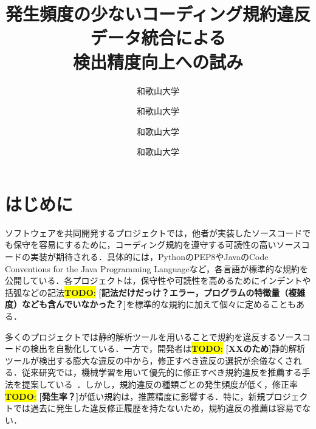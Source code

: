 \documentclass[uplatex,dvipdfmx,a4paper,twocolumn,base=11pt,jbase=11pt,ja=standard]{bxjsarticle}  %
\title{発生頻度の少ないコーディング規約違反データ統合による\\検出精度向上への試み}{Toward improving detection accuracy by integrating occasional coding convention violations datasets}
\author{和歌山大学}{亀岡　令}{Ryo Kameoka, Wakayama University}
\author{和歌山大学}{伊原 彰紀}{Akinori Ihara, Wakayama University}
\author{和歌山大学}{南 雄太}{Yuta Minami, Wakayama University}
\author{和歌山大学}{大森　楓木}{Fuki Omori, Wakayama University}
\newcommand{\todo}[1]{\colorbox{yellow}{{\bf TODO}:}{\color{red} {\textbf{[#1]}}}}
\begin{document}
\maketitle

\section{はじめに}
ソフトウェアを共同開発するプロジェクトでは，他者が実装したソースコードでも保守を容易にするために，コーディング規約を遵守する可読性の高いソースコードの実装が期待される．具体的には，PythonのPEP8やJavaのCode Conventions for the Java Programming Languageなど，各言語が標準的な規約を公開している．各プロジェクトは，保守性や可読性を高めるためにインデントや括弧などの記法\todo{記法だけだっけ？エラー，プログラムの特徴量（複雑度）なども含んでいなかった？}を標準的な規約に加えて個々に定めることもある．


多くのプロジェクトでは静的解析ツールを用いることで規約を違反するソースコードの検出を自動化している．一方で，開発者は\todo{XXのため}静的解析ツールが検出する膨大な違反の中から，修正すべき違反の選択が余儀なくされる．従来研究では，機械学習を用いて優先的に修正すべき規約違反を推薦する手法を提案している~\cite{article1}．しかし，規約違反の種類ごとの発生頻度が低く，修正率\todo{発生率？}が低い規約は，推薦精度に影響する．特に，新規プロジェクトでは過去に発生した違反修正履歴を持たないため，規約違反の推薦は容易でない．


\end{document}
